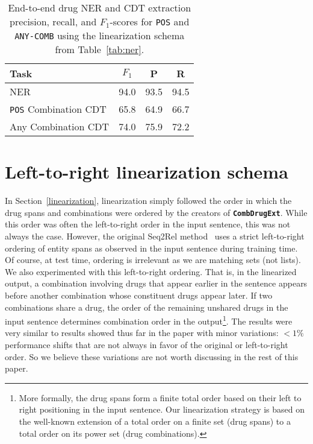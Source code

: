 \documentclass[conference]{IEEEtran}
\begin{document}
\begin{table}[h]
\centering
 \renewcommand{\arraystretch}{1.3}
 \caption{End-to-end drug NER and CDT extraction precision, recall, and $F_1$-scores for \texttt{POS} and \texttt{ANY-COMB} using the linearization schema from Table~\ref{tab:ner}. }
\label{tb:nerf1}
\begin{tabular}{lccc}
\toprule
Task & $F_1$ & P & R\\\midrule
NER  & 94.0 & 93.5 & 94.5 \\\midrule
 \texttt{POS} Combination CDT & 65.8 & 64.9 & 66.7 \\
 Any Combination CDT & 74.0 & 75.9 & 72.2\\
\bottomrule
\end{tabular}


\end{table}

\section{Left-to-right linearization schema}
\label{sec-left-to-right}
In Section~\ref{linearization}, linearization simply followed the order in which the drug spans and combinations were ordered by the creators of \textbf{\texttt{CombDrugExt}}. While this order was often the left-to-right order in the input sentence, this was not always the case.  However, the original Seq2Rel method~\cite{giorgi-etal-2022-sequence} uses a strict left-to-right ordering of entity spans as observed in the input sentence during training time. Of course, at test time, ordering is irrelevant as we are matching sets (not lists). We also experimented with this left-to-right ordering.  
That is, in the linearized output, a combination involving drugs that appear  earlier in the sentence appears before another combination whose constituent drugs appear later. If two combinations share a drug, the order of the remaining unshared drugs in the input sentence determines combination order in the output\footnote{More formally, the drug spans form a finite total order based on their left to right positioning in the input sentence. Our linearization strategy is based on the well-known extension of a total order on a finite set (drug spans) to a total order on its power set (drug combinations).}. The results were very similar to results showed thus far in the paper with minor variations: $<1\%$  performance shifts that are not always in favor of the original or left-to-right order. So we believe these variations are not worth discussing in the rest of this paper.  
\end{document}
